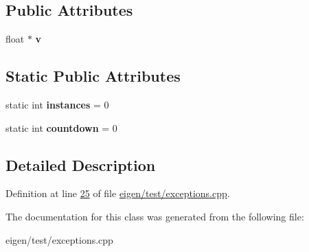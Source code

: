 \subsection*{Public Attributes}
\begin{DoxyCompactItemize}
\item 
\mbox{\label{class_scalar_with_exceptions_a63d05394dfcbd3f5f4fbc2d9cb2829bc}} 
float $\ast$ {\bfseries v}
\end{DoxyCompactItemize}
\subsection*{Static Public Attributes}
\begin{DoxyCompactItemize}
\item 
\mbox{\label{class_scalar_with_exceptions_ad8e7f3217a62625868366467a51c11a8}} 
static int {\bfseries instances} = 0
\item 
\mbox{\label{class_scalar_with_exceptions_aa388458375b182a2262bdac51a50d311}} 
static int {\bfseries countdown} = 0
\end{DoxyCompactItemize}


\subsection{Detailed Description}


Definition at line \hyperlink{eigen_2test_2exceptions_8cpp_source_l00025}{25} of file \hyperlink{eigen_2test_2exceptions_8cpp_source}{eigen/test/exceptions.\+cpp}.



The documentation for this class was generated from the following file\+:\begin{DoxyCompactItemize}
\item 
eigen/test/exceptions.\+cpp\end{DoxyCompactItemize}
